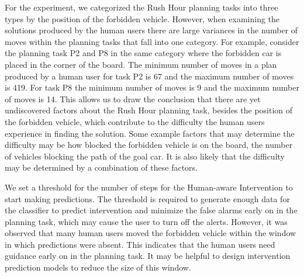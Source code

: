 For the experiment, we categorized the Rush Hour planning tasks into three types by the position of the forbidden vehicle.
However, when examining the solutions produced by the human users there are large variances in the number of moves within the planning tasks that fall into one category.
For example, consider the planning task P2 and P8 in the same category where the forbidden car is placed in the corner of the board.
The minimum number of moves in a plan produced by a human user for task P2 is 67 and the maximum number of moves is 419.
For task P8 the minimum number of moves is 9 and the maximum number of moves is 14.
This allows us to draw the conclusion that there are yet undiscovered factors  about the Rush Hour planning task, besides the position of the forbidden vehicle, which contribute to the difficulty the human users experience in finding the solution.
Some example factors that may determine the difficulty may be how blocked the forbidden vehicle is on the board, the number of vehicles blocking the path of the goal car.
It is also likely that the difficulty may be determined by a combination of these factors.

We set a threshold for the number of steps for the Human-aware Intervention to start making predictions. 
The threshold is required to generate enough data for the classifier to predict intervention and minimize the false alarms early on in the planning task, which may cause the user to turn off the alerts.
However, it was observed that many human users moved the forbidden vehicle within the window in which predictions were absent.
This indicates that the human users need guidance early on in the planning task.
It may be helpful to design intervention prediction models to reduce the size of this window.
